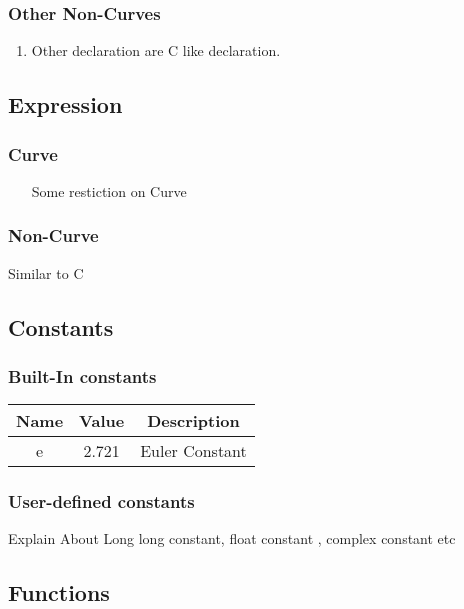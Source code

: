 \documentclass[12pt]{article}
\begin{document}
    \subsubsection{Other Non-Curves}
    \begin{enumerate}
        \item Other declaration are C like declaration.
    \end{enumerate}
    \subsection{Expression}
    \subsubsection{Curve}
    \begin{enumerate}
        \item [Some restiction on Curve]
    \end{enumerate}
    \subsubsection{Non-Curve}
    Similar to C
    \subsection{Constants}

    \subsubsection{Built-In constants}
    \begin{table}[H]
        \centering
        \begin{tabular}{|c|c|c|}
            \hline
            \textbf{Name} & \textbf{Value} & \textbf{Description} \\
            \hline
            e&  2.721 & Euler Constant  \\
            \hline
        \end{tabular}
    \end{table}
    \subsubsection{User-defined constants}
    Explain About Long long constant, float constant , complex constant etc
    \subsection{Functions}
\end{document}
